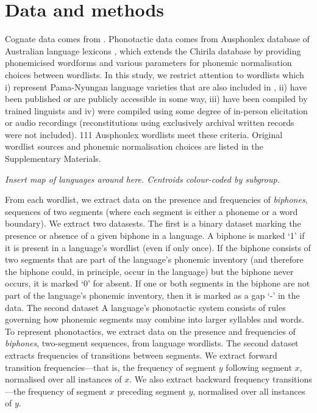 \documentclass[]{article}
\begin{document}
\hypertarget{pn-tree-methods}{%
\section{Data and methods}\label{pn-tree-methods}}

Cognate data comes from \autocite{bouckaert_origin_2018}. Phonotactic data comes from Ausphonlex database of Australian language lexicons \autocite{round_ausphon-lexicon_2017}, which extends the Chirila database \autocite{bowern_chirila_2016} by providing phonemicised wordforms and various parameters for phonemic normalisation choices between wordlists. In this study, we restrict attention to wordlists which i) represent Pama-Nyungan language varieties that are also included in \textcite{bouckaert_origin_2018}, ii) have been published or are publicly accessible in some way, iii) have been compiled by trained linguists and iv) were compiled using some degree of in-person elicitation or audio recordings (reconstitutions using exclusively archival written records were not included). 111 Ausphonlex wordlists meet these criteria. Original wordlist sources and phonemic normalisation choices are listed in the Supplementary Materials.

\emph{Insert map of languages around here. Centroids colour-coded by subgroup.}

From each wordlist, we extract data on the presence and frequencies of \emph{biphones}, sequences of two segments (where each segment is either a phoneme or a word boundary). We extract two datasests. The first is a binary dataset marking the presence or absence of a given biphone in a language. A biphone is marked `1' if it is present in a language's wordlist (even if only once). If the biphone consists of two segments that are part of the language's phonemic inventory (and therefore the biphone could, in principle, occur in the language) but the biphone never occurs, it is marked `0' for absent. If one or both segments in the biphone are not part of the language's phonemic inventory, then it is marked as a gap `-' in the data. The second dataset A language's phonotactic system consists of rules governing how phonemic segments may combine into larger syllables and words. To represent phonotactics, we extract data on the presence and frequencies of \emph{biphones}, two-segment sequences, from language wordlists. The second dataset extracts frequencies of transitions between segments. We extract forward transition frequencies---that is, the frequency of segment \(y\) following segment \(x\), normalised over all instances of \(x\). We also extract backward frequency transitions---the frequency of segment \(x\) preceding segment \(y\), normalised over all instances of \(y\).
\end{document}
